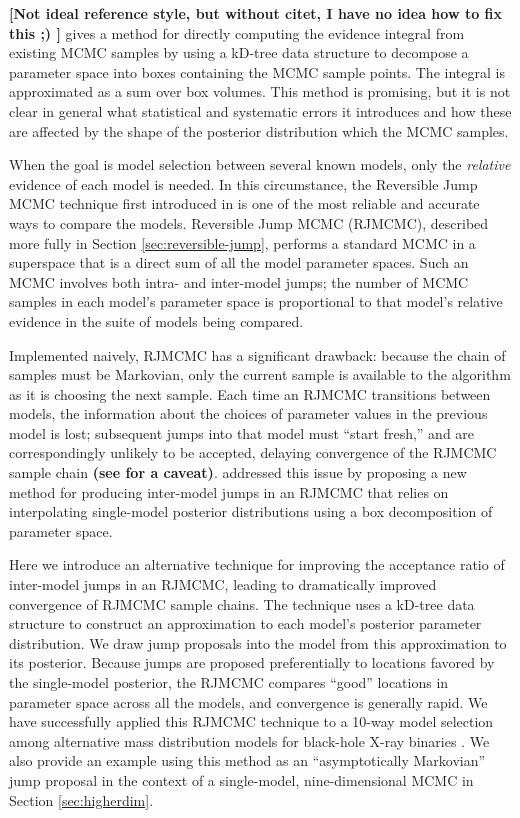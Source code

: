 \documentclass{iopart}
\newcommand{\ilya}[1]{{\color{red} \bf #1}}
\begin{document}
\cite{Weinberg2009} \ilya{[Not ideal reference style, but without citet, I have no idea how to fix this ;) ]}
gives a method for directly computing
the evidence integral from existing MCMC samples by using a kD-tree
data structure to decompose a parameter space into boxes containing
the MCMC sample points.  The integral is approximated as a sum over
box volumes.  This method is promising, but it is not clear in general
what statistical and systematic errors it introduces and how these are
affected by the shape of the posterior distribution which the
MCMC samples.

When the goal is model selection between several known models, only
the \emph{relative} evidence of each model is needed.  In this
circumstance, the Reversible Jump MCMC technique first introduced in
\cite{Green1995} is one of the most reliable and accurate ways to
compare the models.  Reversible Jump MCMC (RJMCMC), described more
fully in Section \ref{sec:reversible-jump}, performs a standard MCMC
in a superspace that is a direct sum of all the model parameter
spaces.  Such an MCMC involves both intra- and inter-model jumps; the
number of MCMC samples in each model's parameter space is proportional
to that model's relative evidence in the suite of models being
compared.

Implemented naively, RJMCMC has a significant drawback: because the
chain of samples must be Markovian, only the current sample is
available to the algorithm as it is choosing the next sample.  Each
time an RJMCMC transitions between models, the information about the
choices of parameter values in the previous model is lost; subsequent
jumps into that model must ``start fresh,'' and are correspondingly
unlikely to be accepted, delaying convergence of the RJMCMC sample
chain \ilya{(see  for a caveat)}.  \cite{Littenberg2009} addressed this issue by proposing a new
method for producing inter-model jumps in an RJMCMC that relies on
interpolating single-model posterior distributions using a box
decomposition of parameter space.

Here we introduce an alternative technique for improving the
acceptance ratio of inter-model jumps in an RJMCMC, leading to
dramatically improved convergence of RJMCMC sample chains.  The
technique uses a kD-tree data structure to construct an approximation
to each model's posterior parameter distribution.  We draw jump
proposals into the model from this approximation to its posterior.
Because jumps are proposed preferentially to locations favored by the
single-model posterior, the RJMCMC compares ``good'' locations in
parameter space across all the models, and convergence is generally
rapid.  We have successfully applied this RJMCMC technique to a 10-way
model selection among alternative mass distribution models for
black-hole X-ray binaries \cite{Farr2010}.  We also provide an example
using this method as an ``asymptotically Markovian''
\cite{terBraak2008} jump proposal in the context of a single-model,
nine-dimensional MCMC in Section \ref{sec:higherdim}.
\end{document}
